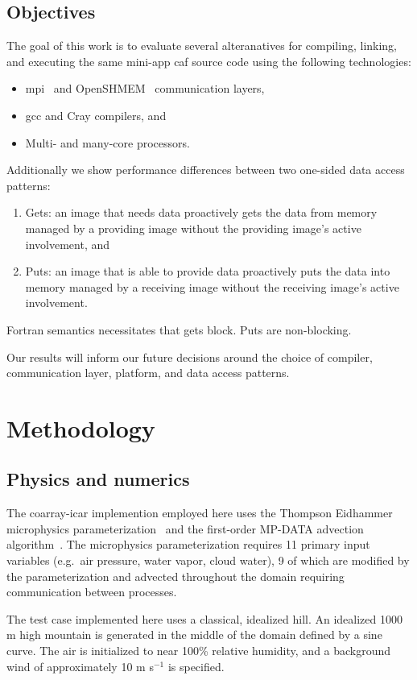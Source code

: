\subsection{Objectives}
The goal of this work is to evaluate several alteranatives for compiling, linking, and executing the
same \gls{mini-app} \gls{caf} source code using the following technologies:
\begin{itemize}
  \item \gls{mpi}~\cite{mpiforum2016mpi} and OpenSHMEM~\cite{chapman2010introducing} communication layers,
  \item \gls{gcc} and Cray compilers, and
  \item Multi- and many-core processors.
\end{itemize}
Additionally we show performance differences between two one-sided data access patterns:
\begin{enumerate}
  \item Gets: an image that needs data proactively gets the data from memory managed by a providing
        image without the providing image's active involvement, and
  \item Puts: an image that is able to provide data proactively puts the data into memory managed by
        a receiving image without the receiving image's active involvement.
\end{enumerate}
Fortran semantics necessitates that gets block.  Puts are non-blocking.

Our results will inform our future decisions around the choice of compiler, communication
layer, platform, and data access patterns.

\section{Methodology}
\subsection{Physics and numerics}
The coarray-\gls{icar} implemention employed here uses the Thompson Eidhammer microphysics parameterization~\cite{Thompson:2014cw} and the first-order MP-DATA advection algorithm~\cite{Smolarkiewicz:1998il}.
The microphysics parameterization requires 11 primary input variables (e.g.\ air pressure, water vapor, cloud water), 9 of which are modified by the parameterization and advected throughout the domain requiring communication between processes.

The test case implemented here uses a classical, idealized hill.
An idealized 1000 m high mountain is generated in the middle of the domain defined by a sine curve.
The air is initialized to near 100\% relative humidity, and a background wind of approximately 10 m s$^{-1}$ is specified.

